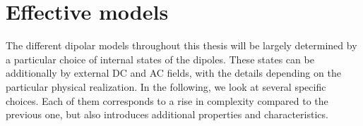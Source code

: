 

\section{Effective models}
The different dipolar models throughout this thesis will be largely determined by a particular choice of internal states of the dipoles. These states can be additionally  by external DC and AC fields, with the details depending on the particular physical realization.
In the following, we look at several specific choices. Each of them corresponds to a rise in complexity compared to the previous one, but also introduces additional properties and characteristics.

